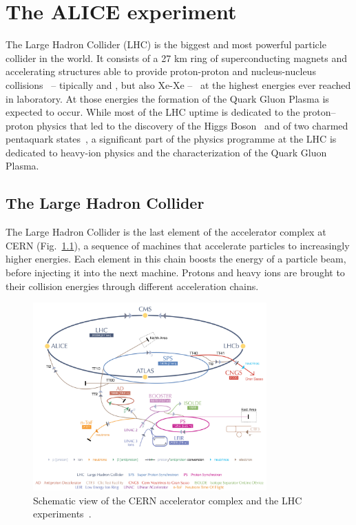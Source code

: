 %
\chapter{The ALICE experiment}
\label{sec:3}


The Large Hadron Collider (LHC) is the biggest and most powerful particle collider in the world.
It consists of a 27 km ring of superconducting magnets and accelerating structures able to
provide proton-proton and nucleus-nucleus collisions \ -- tipically \pPb and \PbPb, but also
Xe-Xe -- \ at the highest energies ever reached in laboratory.
At those energies the formation of the Quark Gluon Plasma is expected to occur.
While most of the LHC uptime is dedicated to the proton–proton physics that led to the discovery of 
the Higgs Boson~\cite{atlashiggs,cmshiggs} and of two charmed pentaquark states~\cite{lhcbpenta}, 
a significant part of the physics programme at the LHC is dedicated to heavy-ion physics and the 
characterization of the Quark Gluon Plasma.

\section{The Large Hadron Collider} \label{sec:3.1}

The Large Hadron Collider is the last element of the accelerator complex at CERN 
(Fig.~\ref{fig:lhc}), a sequence of machines that accelerate particles to increasingly higher
energies.
Each element in this chain boosts the energy of a particle beam, before injecting it into the next
machine. Protons and heavy ions are brought to their collision energies through different
acceleration chains.

\begin{figure}
    \centering
    \includegraphics[width=0.8\textwidth]{gfx/lhc}
	\caption{Schematic view of the CERN accelerator complex and the LHC experiments~\cite{lhc}.}
	\label{fig:lhc}
\end{figure}

